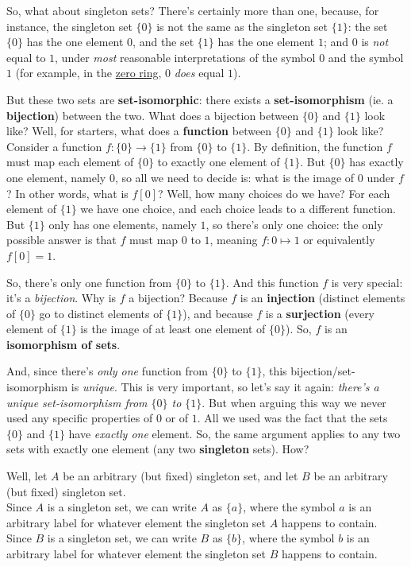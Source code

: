 So, what about singleton sets? There's certainly more than one,
because, for instance, the singleton set $\{0\}$ is not the same as the singleton set $\{1\}$:
the set $\{0\}$ has the one element $0$, and the set $\{1\}$ has the one element $1$;
and $0$ is {\it not} equal to $1$, under {\it most} reasonable interpretations of the symbol $0$ and the symbol $1$
(for example, in the
\href{https://ncatlab.org/nlab/show/trivial+ring}{zero ring},
$0$ {\it does} equal $1$).

But these two sets are {\bf set-isomorphic}: there exists a {\bf set-isomorphism} (ie. a {\bf bijection}) between the two.
What does a bijection between $\{0\}$ and $\{1\}$ look like?
Well, for starters, what does a {\bf function} between $\{0\}$ and $\{1\}$ look like?
Consider a function $f: \{0\} \to \{1\}$ from $\{0\}$ to $\{1\}$.
By definition, the function $f$ must map each element of $\{0\}$ to exactly one element of $\{1\}$.
But $\{0\}$ has exactly one element, namely $0$, so all we need to decide is: what is the image of $0$ under $f$?
In other words, what is $f[0]$? Well, how many choices do we have?
For each element of $\{1\}$ we have one choice, and each choice leads to a different function.
But $\{1\}$ only has one elements, namely $1$, so there's only one choice:
the only possible answer is that $f$ must map $0$ to $1$, meaning $f: 0 \mapsto 1$ or equivalently $f[0] = 1$.

So, there's only one function from $\{0\}$ to $\{1\}$. And this function $f$ is very special: it's a {\it bijection}.
Why is $f$ a bijection? Because $f$ is an {\bf injection} (distinct elements of $\{0\}$ go to distinct elements of $\{1\}$),
and because $f$ is a {\bf surjection} (every element of $\{1\}$ is the image of at least one element of $\{0\}$).
So, $f$ is an {\bf isomorphism of sets}.

And, since there's {\it only one} function from $\{0\}$ to $\{1\}$, this bijection/set-isomorphism is {\it unique}.
This is very important, so let's say it again: {\it there's a unique set-isomorphism from $\{0\}$ to $\{1\}$}.
But when arguing this way we never used any specific properties of $0$ or of $1$.
All we used was the fact that the sets $\{0\}$ and $\{1\}$ have {\it exactly one} element.
So, the same argument applies to any two sets with exactly one element (any two {\bf singleton} sets). How?

Well, let $A$ be an arbitrary (but fixed) singleton set, and let $B$ be an arbitrary (but fixed) singleton set. \\
Since $A$ is a singleton set, we can write $A$ as $\{a\}$, where the symbol $a$ is an arbitrary label for whatever element the singleton set $A$ happens to contain. \\
Since $B$ is a singleton set, we can write $B$ as $\{b\}$, where the symbol $b$ is an arbitrary label for whatever element the singleton set $B$ happens to contain. \\

